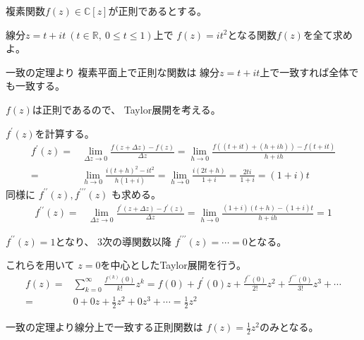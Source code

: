\documentclass[12pt,b5paper]{ltjsarticle}
\begin{document}
\hrulefill

複素関数$f(z)\in\mathbb{C}[z]$が正則であるとする。

線分$z=t+it \ (t\in\mathbb{R}, \ 0 \leq t \leq 1)$上で
$f(z)=it^2$となる関数$f(z)$を全て求めよ。

\dotfill

一致の定理より
複素平面上で正則な関数は
線分$z=t+it$上で一致すれば全体でも一致する。

$f(z)$は正則であるので、
Taylor展開を考える。

$f^{\prime}(z)$を計算する。
\begin{align}
 f^{\prime}(z)
  =& \lim_{\Delta z \to 0} \frac{f(z+ \Delta z)-f(z)}{\Delta z}
  = \lim_{h \to 0} \frac{f((t+it)+(h+ih))-f(t+it)}{h+ih}\\
  =& \lim_{h \to 0} \frac{i(t+h)^2-it^2}{h(1+i)}
  = \lim_{h \to 0} \frac{i(2t+h)}{1+i}
  = \frac{2ti}{1+i}
  = (1+i)t
\end{align}
同様に
$f^{\prime\prime}(z),f^{\prime\prime\prime}(z)$
も求める。
\begin{align}
 f^{\prime\prime}(z)
  =& \lim_{\Delta z \to 0}
  \frac{f^{\prime}(z+ \Delta z)-f^{\prime}(z)}{\Delta z}
 = \lim_{h\to 0} \frac{(1+i)(t+h) - (1+i)t}{h+ih}
 =1
\end{align}

$f^{\prime\prime}(z)=1$となり、
3次の導関数以降
$f^{\prime\prime\prime}(z)=\cdots =0$となる。


これらを用いて
$z=0$を中心としたTaylor展開を行う。
\begin{align}
 f(z)
  =& \sum_{k=0}^{\infty}\frac{f^{(k)}(0)}{k!}z^k
  = f(0) + f^{\prime}(0)z + \frac{f^{\prime\prime}(0)}{2!}z^{2} + \frac{f^{\prime\prime\prime}(0)}{3!}z^{3} +\cdots\\
  =& 0 + 0z + \frac{1}{2}z^2 + 0z^3 + \cdots
  = \frac{1}{2}z^2
\end{align}

一致の定理より線分上で一致する正則関数は
$f(z)=\frac{1}{2}z^2$のみとなる。

\hrulefill
\end{document}
